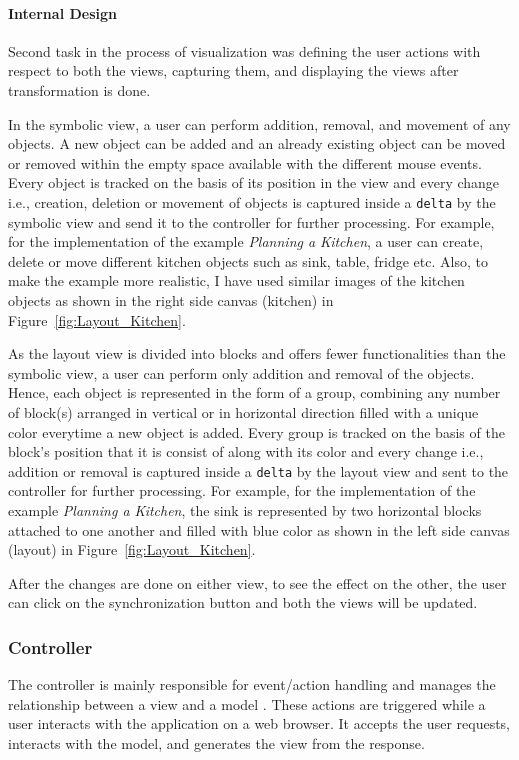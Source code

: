 \paragraph{Internal Design}
Second task in the process of visualization was defining the user actions with respect to both the views, capturing them, and displaying the views after transformation is done.

In the symbolic view, a user can perform addition, removal, and movement of any objects. A new object can be added and an already existing object can be moved or removed within the empty space available with the different mouse events. Every object is tracked on the basis of its position in the view and every change i.e., creation, deletion or movement of objects is captured inside a \texttt{delta} by the symbolic view and send it to the controller for further processing. For example, for the implementation of the example \textit{Planning a Kitchen}, a user can create, delete or move different kitchen objects such as sink, table, fridge etc. Also, to make the example more realistic, I have used similar images of the kitchen objects as shown in the right side canvas (kitchen) in Figure~\ref{fig:Layout_Kitchen}. 

As the layout view is divided into blocks and offers fewer functionalities than the symbolic view, a user can perform only addition and removal of the objects. Hence, each object is represented in the form of a group, combining any number of block(s) arranged in vertical or in horizontal direction filled with a unique color everytime a new object is added. Every group is tracked on the basis of the block's position that it is consist of along with its color and every change i.e., addition or removal is captured inside a \texttt{delta} by the layout view and sent to the controller for further processing. For example, for the implementation of the example \textit{Planning a Kitchen}, the sink is represented by two horizontal blocks attached to one another and filled with {\color{blue} blue} color as shown in the left side canvas (layout) in Figure~\ref{fig:Layout_Kitchen}. 

After the changes are done on either view, to see the effect on the other, the user can click on the synchronization button and both the views will be updated.
 
\subsubsection{Controller}\label{subsubsec:design_controller}
The controller is mainly responsible for event/action handling and manages the relationship between a view and a model \cite{mdd-webwithmvc}. These actions are triggered while a user interacts with the application on a web browser. It accepts the user requests, interacts with the model, and generates the view from the response.

